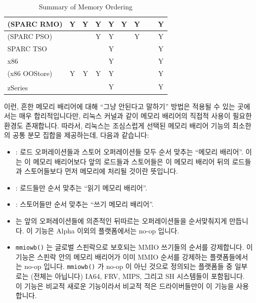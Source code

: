 \begin{table}
\begin{tabular}{l|c|c|c|c|c|c|c|c}
	\hline
	(SPARC RMO)	& Y & Y & Y & Y   & Y & Y & ~ & Y \\
	\hline
	(SPARC PSO)	& ~ & ~ & Y & Y   & ~ & Y & ~ & Y \\
	\hline
	SPARC TSO	& ~ & ~ & ~ & Y   & ~ & ~ & ~ & Y \\
	\hline
	x86		& ~ & ~ & ~ & Y   & ~ & ~ & ~ & Y \\
	\hline
	(x86 OOStore)	& Y & Y & Y & Y   & ~ & ~ & ~ & Y \\
	\hline
	zSeries\textsuperscript{\textregistered}
			& ~ & ~ & ~ & Y   & ~ & ~ & ~ & Y \\
\end{tabular}
\caption{Summary of Memory Ordering}
\label{tab:app:whymb:Summary of Memory Ordering}
\end{table}

이런, 흔한 메모리 배리어에 대해 ``그냥 안된다고 말하기'' 방법은 적용될 수 있는
곳에서는 매우 합리적입니다만, 리눅스 커널과 같이 메모리 배리어의 직접적 사용이
필요한 환경도 존재합니다.
따라서, 리눅스는 조심스럽게 선택된 메모리 배리어 기능의 최소한의 공통 분모
집합을 제공하는데, 다음과 같습니다:
\begin{itemize}
\item	{}: 로드 오퍼레이션들과 스토어 오퍼레이션들 모두 순서
	맞추는 ``메모리 배리어''.
	이는 이 메모리 배리어보다 앞의 로드들과 스토어들은 이 메모리 배리어
	뒤의 로드들과 스토어들보다 먼저 메모리에 처리될 것이란 뜻입니다.
\item	{}: 로드들만 순서 맞추는 ``읽기 메모리 배리어''.
\item	{}: 스토어들만 순서 맞추는 ``쓰기 메모리 배리어''.
\item	{} 는 앞의 오퍼레이션들에 의존적인
	뒤따르는 오퍼레이션들을 순서맞춰지게 만듭니다.
	이 기능은 Alpha 이외의 플랫폼에서는 no-op 입니다.
\item	{\tt mmiowb()} 는 글로벌 스핀락으로 보호되는 MMIO 쓰기들의 순서를
	강제합니다.
	이 기능은 스핀락 안의 메모리 배리어가 이미 MMIO 순서를 강제하는
	플랫폼들에서는 no-op 입니다.
	{\tt mmiowb()} 가 no-op 이 아닌 것으로 정의되는 플랫폼들 중 일부로는
	(전체는 아닙니다) IA64, FRV, MIPS, 그리고 SH 시스템들이 포함됩니다.
	이 기능은 비교적 새로운 기능이라서 비교적 적은 드라이버들만이 이 기능을
	사용합니다.
\end{itemize}
\iffalse

